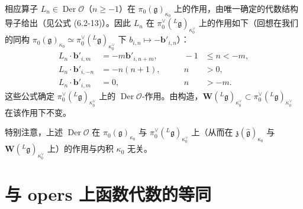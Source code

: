 
相应算子 $L_n\in\operatorname{Der}\mathcal O$（$n\ge-1$）在 $\pi_0(\mathfrak g)_{\kappa_0}$ 上的作用，由唯一确定的代数结构导子给出（见公式 (6.2-13)）。因此 $L_n$ 在 $\pi^\vee_0({}^L\mathfrak g)_{\kappa^\vee_0}$ 上的作用如下（回想在我们的同构 $\pi_0(\mathfrak g)_{\kappa_0}\simeq\pi^\vee_0({}^L\mathfrak g)_{\kappa^\vee_0}$ 下 $b_{i,n}\mapsto-\mathbf b'_{i,n}$）：
\begin{equation}
\begin{aligned}
    L_n\cdot\mathbf b'_{i,m}&=-m\mathbf b'_{i,n+m},&\qquad -1&\le n<-m,\\
    L_n\cdot\mathbf b'_{i,-n}&=-n(n+1),&\qquad n&>0,\\
    L_n\cdot\mathbf b'_{i,m}&=0,&\qquad n&>-m.
\end{aligned}
\tag{8.1-11}
\end{equation}
这些公式确定 $\pi^\vee_0({}^L\mathfrak g)_{\kappa^\vee_0}$ 上的 $\operatorname{Der}\mathcal O$-作用。由构造，$\mathbf W({}^L\mathfrak g)_{\kappa^\vee_0}\subset\pi^\vee_0({}^L\mathfrak g)_{\kappa^\vee_0}$ 在该作用下不变。

特别注意，上述 $\operatorname{Der}\mathcal O$ 在 $\pi_0(\mathfrak g)_{\kappa_0}$ 与 $\pi^\vee_0({}^L\mathfrak g)_{\kappa^\vee_0}$ 上（从而在 $\mathfrak z(\hat{\mathfrak g})_{\kappa_0}$ 与 $\mathbf W({}^L\mathfrak g)_{\kappa^\vee_0}$ 上）的作用与内积 $\kappa_0$ 无关。


\section{与 opers 上函数代数的等同}

